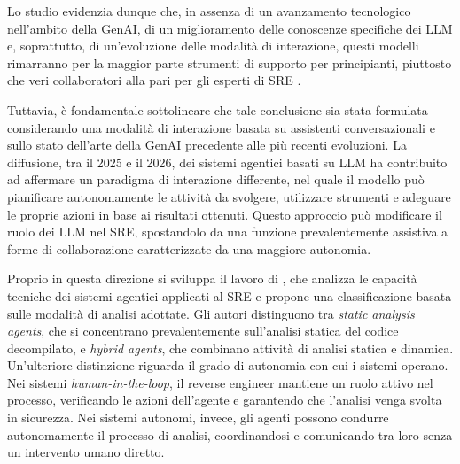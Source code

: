 
Lo studio evidenzia dunque che, in assenza di un avanzamento tecnologico nell'ambito della GenAI, di un miglioramento delle conoscenze specifiche dei LLM e, soprattutto, di un'evoluzione delle modalità di interazione, questi modelli rimarranno per la maggior parte strumenti di supporto per principianti, piuttosto che veri collaboratori alla pari per gli esperti di SRE \cite{basque2026srellmstudy}.


Tuttavia, è fondamentale sottolineare che tale conclusione sia stata formulata considerando una modalità di interazione basata su assistenti conversazionali e sullo stato dell'arte della GenAI precedente alle più recenti evoluzioni. La diffusione, tra il 2025 e il 2026, dei sistemi agentici basati su LLM ha contribuito ad affermare un paradigma di interazione differente, nel quale il modello può pianificare autonomamente le attività da svolgere, utilizzare strumenti e adeguare le proprie azioni in base ai risultati ottenuti. Questo approccio può modificare il ruolo dei LLM nel SRE, spostandolo da una funzione prevalentemente assistiva a forme di collaborazione caratterizzate da una maggiore autonomia.

Proprio in questa direzione si sviluppa il lavoro di \textcite{radey2026challenges}, che analizza le capacità tecniche dei sistemi agentici applicati al SRE e propone una classificazione basata sulle modalità di analisi adottate. Gli autori distinguono tra \emph{static analysis agents}, che si concentrano prevalentemente sull'analisi statica del codice decompilato, e \emph{hybrid agents}, che combinano attività di analisi statica e dinamica. Un'ulteriore distinzione riguarda il grado di autonomia con cui i sistemi operano. Nei sistemi \emph{human-in-the-loop}, il reverse engineer mantiene un ruolo attivo nel processo, verificando le azioni dell'agente e garantendo che l'analisi venga svolta in sicurezza. Nei sistemi autonomi, invece, gli agenti possono condurre autonomamente il processo di analisi, coordinandosi e comunicando tra loro senza un intervento umano diretto.

